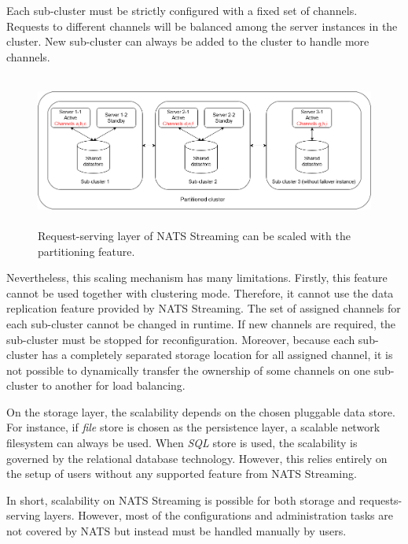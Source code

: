 Each sub-cluster must be strictly configured with a fixed set of channels. Requests to different channels will be balanced among the server instances in the cluster. New sub-cluster can always be added to the cluster to handle more channels. 
\begin{figure}[h]
	\centering
	\includegraphics[width=12cm,height=5cm]{images/scalability-nats.png}
	\caption{Request-serving layer of NATS Streaming can be scaled with the partitioning feature.}
	\label{fig:scalabilitynats}
\end{figure}

Nevertheless, this scaling mechanism has many limitations. Firstly, this feature cannot be used together with clustering mode. Therefore, it cannot use the data replication feature provided by NATS Streaming. The set of assigned channels for each sub-cluster cannot be changed in runtime. If new channels are required, the sub-cluster must be stopped for reconfiguration. Moreover, because each sub-cluster has a completely separated storage location for all assigned channel, it is not possible to dynamically transfer the ownership of some channels on one sub-cluster to another for load balancing.
 
On the storage layer, the scalability depends on the chosen pluggable data store. For instance, if \emph{file} store is chosen as the persistence layer, a scalable network filesystem can always be used. When \emph{SQL} store is used, the scalability is governed by the relational database technology. However, this relies entirely on the setup of users without any supported feature from NATS Streaming. 

In short, scalability on NATS Streaming is possible for both storage and requests-serving layers. However, most of the configurations and administration tasks are not covered by NATS but instead must be handled manually by users. 

